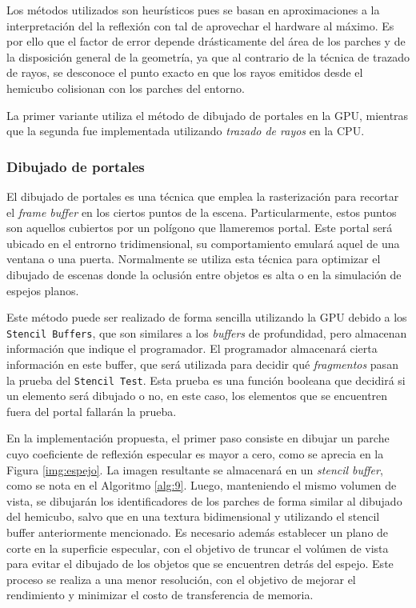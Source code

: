 Los métodos utilizados son heurísticos pues se basan en aproximaciones a la interpretación del la reflexión con tal de aprovechar el hardware al máximo. Es por ello que el factor de error depende drásticamente del área de los parches y de la disposición general de la geometría, ya que al contrario de la técnica de trazado de rayos, se desconoce el punto exacto en que los rayos emitidos desde el hemicubo colisionan con los parches del entorno.

La primer variante utiliza el método de dibujado de portales en la GPU, mientras que la segunda fue implementada utilizando \textit{trazado de rayos} en la CPU.

\subsubsection{Dibujado de portales}

El dibujado de portales es una técnica que emplea la rasterización para recortar el \textit{frame buffer} en los ciertos puntos de la escena. Particularmente, estos puntos son aquellos cubiertos por un polígono que llameremos portal. Este portal será ubicado en el entrorno tridimensional, su comportamiento emulará aquel de una ventana o una puerta. Normalmente se utiliza esta técnica para optimizar el dibujado de escenas donde la oclusión entre objetos es alta o en la simulación de espejos planos.

Este método puede ser realizado de forma sencilla utilizando la GPU debido a los \verb|Stencil Buffers|, que son similares a los \textit{buffers} de profundidad, pero almacenan información que indique el programador. El programador almacenará cierta información en este buffer, que será utilizada para decidir qué \textit{fragmentos} pasan la prueba del \verb|Stencil Test|. Esta prueba es una función booleana que decidirá si un elemento será dibujado o no, en este caso, los elementos que se encuentren fuera del portal fallarán la prueba.

En la implementación propuesta, el primer paso consiste en dibujar un parche cuyo coeficiente de reflexión especular es mayor a cero, como se aprecia en la Figura \ref{img:espejo}. La imagen resultante se almacenará en un \textit{stencil buffer}, como se nota en el Algoritmo \ref{alg:9}. Luego, manteniendo el mismo volumen de vista, se dibujarán los identificadores de los parches de forma similar al dibujado del hemicubo, salvo que en una textura bidimensional y utilizando el stencil buffer anteriormente mencionado. Es necesario además establecer un plano de corte en la superficie especular, con el objetivo de truncar el volúmen de vista para evitar el dibujado de los objetos que se encuentren detrás del espejo. Este proceso se realiza a una menor resolución, con el objetivo de mejorar el rendimiento y minimizar el costo de transferencia de memoria.

